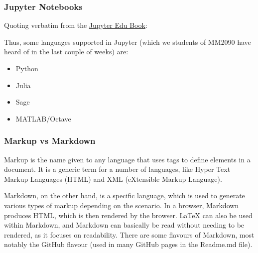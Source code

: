 \documentclass[12pt,a4paper]{article}
\begin{document}
\subsubsection{Jupyter Notebooks}
Quoting verbatim from the \href{https://jupyter4edu.github.io/jupyter-edu-book/jupyter.html#targetText=The%20Jupyter%20system%20supports%20over,additional%20kernels%20may%20be%20installed.}{Jupyter Edu Book}:


Thus, some languages supported in Jupyter (which we students of MM2090 have heard of in the last couple of weeks) are:

\begin{itemize}
	\item Python
	\item Julia
	\item Sage
	\item MATLAB/Octave
\end{itemize}

\subsubsection{Markup vs Markdown}

Markup is the name given to any language that uses tags to define elements in a document. It is a generic term for a number of languages, like Hyper Text Markup Languages (HTML) and XML (eXtensible Markup Language). 

Markdown, on the other hand, is a specific language, which is used to generate various types of markup depending on the scenario. In a browser, Markdown produces HTML, which is then rendered by the browser. \LaTeX{} can also be used within Markdown, and Markdown can basically be read without needing to be rendered, as it focuses on readability. There are some flavours of Markdown, most notably the GitHub flavour (used in many GitHub pages in the Readme.md file).
\end{document}
